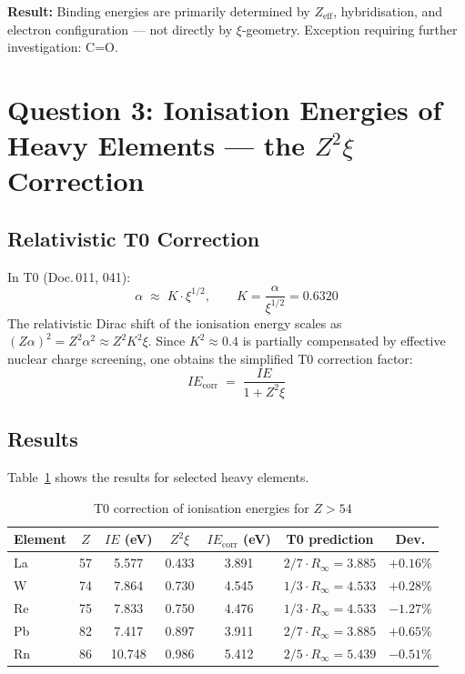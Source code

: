 \textbf{Result:} Binding energies are primarily determined by $Z_\mathrm{eff}$,
hybridisation, and electron configuration — not directly by $\xi$-geometry.
Exception requiring further investigation: C=O.

\section{Question 3: Ionisation Energies of Heavy Elements — the \texorpdfstring{$Z^2\xi$}{Z²ξ} Correction}
\label{sec:heavy-elements}

\subsection{Relativistic T0 Correction}
\label{subsec:rel-correction}

In T0 (Doc.\,011, 041):
\begin{equation}
  \alpha \;\approx\; K \cdot \xi^{1/2}, \qquad K = \frac{\alpha}{\xi^{1/2}} = 0.6320
\end{equation}
The relativistic Dirac shift of the ionisation energy scales as
$(Z\alpha)^2 = Z^2 \alpha^2 \approx Z^2 K^2 \xi$.
Since $K^2 \approx 0.4$ is partially compensated by effective nuclear charge
screening, one obtains the simplified T0 correction factor:
\begin{equation}
  \boxed{IE_\mathrm{corr} \;=\; \frac{IE}{1 + Z^2 \xi}}
  \label{eq:IE-corr}
\end{equation}

\subsection{Results}
\label{subsec:results-heavy}

Table~\ref{tab:heavy-elements} shows the results for selected heavy elements.

\begin{table}[htbp]
\centering
\caption{T0 correction of ionisation energies for $Z > 54$}
\label{tab:heavy-elements}
\begin{tabular}{lcccccc}
\hline
Element & $Z$ & $IE$ (eV) & $Z^2\xi$ & $IE_\mathrm{corr}$ (eV) & T0 prediction & Dev. \\
\hline
La & 57 & 5.577 & 0.433 & 3.891 & $2/7 \cdot R_\infty = 3.885$ & $+0.16\%$ \\
W  & 74 & 7.864 & 0.730 & 4.545 & $1/3 \cdot R_\infty = 4.533$ & $+0.28\%$ \\
Re & 75 & 7.833 & 0.750 & 4.476 & $1/3 \cdot R_\infty = 4.533$ & $-1.27\%$ \\
Pb & 82 & 7.417 & 0.897 & 3.911 & $2/7 \cdot R_\infty = 3.885$ & $+0.65\%$ \\
Rn & 86 & 10.748& 0.986 & 5.412 & $2/5 \cdot R_\infty = 5.439$ & $-0.51\%$ \\
\hline
\end{tabular}
\end{table}

